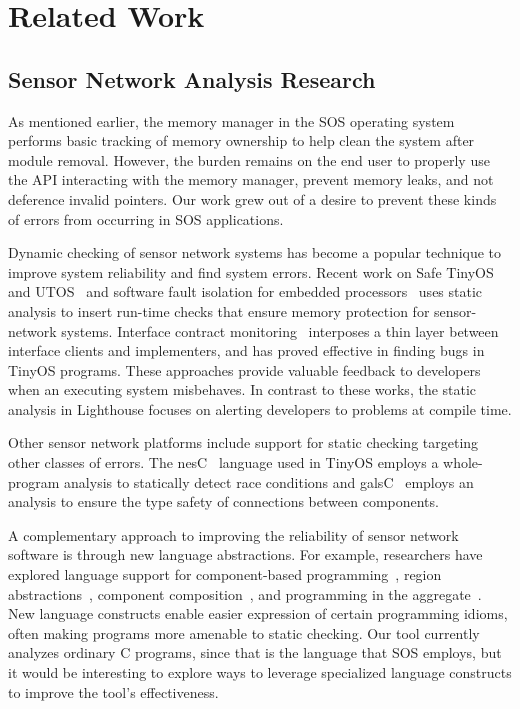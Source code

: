 \section{Related Work}
\label{sec:related}

\subsection{Sensor Network Analysis Research}

As mentioned earlier, the memory manager in the SOS operating
system~\cite{sos} performs basic tracking of memory ownership to help clean
the system after module removal.
%
However, the burden remains on the end user to properly use the API
interacting with the memory manager, prevent memory leaks, and not deference
invalid pointers.
%
Our work grew out of a desire to prevent these kinds of errors from
occurring in SOS applications.



Dynamic checking of sensor network systems has become a popular technique to
improve system reliability and find system errors.
%
Recent work on Safe TinyOS and UTOS~\cite{regehr06memory} and software fault
isolation for embedded processors~\cite{kumar07system} uses static analysis
to insert run-time checks that ensure memory protection for sensor-network
systems.
%
Interface contract monitoring~\cite{archer07interface} interposes a thin
layer between interface clients and implementers, and has proved effective
in finding bugs in TinyOS programs.
%
These approaches provide valuable feedback to developers when an executing
system misbehaves.
%
In contrast to these works, the static analysis in Lighthouse focuses on
alerting developers to problems at compile time.



Other sensor network platforms include support for static checking targeting
other classes of errors.  
%
The nesC~\cite{nesC} language used in TinyOS employs a whole-program
analysis to statically detect race conditions and
galsC~\cite{TinyGALS,galsC} employs an analysis to ensure the type safety of
connections between components.  



A complementary approach to improving the reliability of sensor network
software is through new language abstractions.  
%
For example, researchers have explored language support for component-based
programming~\cite{TinyOS,nesC,galsC}, region
abstractions~\cite{conf/mobisys/WhitehouseSCB04,conf/nsdi/WelshM04},
component composition~\cite{conf/sensys/GreensteinKE04}, and programming in
the aggregate~\cite{1052213,conf/dcoss/GummadiGG05}.
%
New language constructs enable easier expression of certain programming
idioms, often making programs more amenable to static checking.  
%
Our tool currently analyzes ordinary C programs, since that is the language
that SOS employs, but it would be interesting to explore ways to leverage
specialized language constructs to improve the tool's effectiveness.



